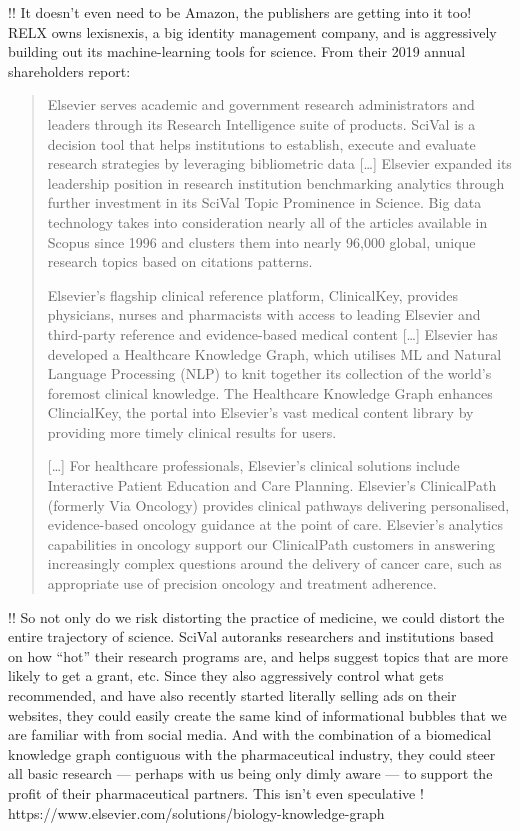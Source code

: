 \documentclass[10pt]{article}
\begin{document}
\begin{multicols}{2}
!! It doesn't even need to be Amazon, the publishers are getting into it
too! RELX owns lexisnexis, a big identity management company, and is
aggressively building out its machine-learning tools for science. From
their 2019 annual shareholders report:

\begin{quote}
Elsevier serves academic and government research administrators and
leaders through its Research Intelligence suite of products. SciVal is a
decision tool that helps institutions to establish, execute and evaluate
research strategies by leveraging bibliometric data {[}\ldots{]}
Elsevier expanded its leadership position in research institution
benchmarking analytics through further investment in its SciVal Topic
Prominence in Science. Big data technology takes into consideration
nearly all of the articles available in Scopus since 1996 and clusters
them into nearly 96,000 global, unique research topics based on
citations patterns.

Elsevier's flagship clinical reference platform, ClinicalKey, provides
physicians, nurses and pharmacists with access to leading Elsevier and
third-party reference and evidence-based medical content {[}\ldots{]}
Elsevier has developed a Healthcare Knowledge Graph, which utilises ML
and Natural Language Processing (NLP) to knit together its collection of
the world's foremost clinical knowledge. The Healthcare Knowledge Graph
enhances ClincialKey, the portal into Elsevier's vast medical content
library by providing more timely clinical results for users.

{[}\ldots{]} For healthcare professionals, Elsevier's clinical solutions
include Interactive Patient Education and Care Planning. Elsevier's
ClinicalPath (formerly Via Oncology) provides clinical pathways
delivering personalised, evidence-based oncology guidance at the point
of care. Elsevier's analytics capabilities in oncology support our
ClinicalPath customers in answering increasingly complex questions
around the delivery of cancer care, such as appropriate use of precision
oncology and treatment adherence.
\end{quote}

!! So not only do we risk distorting the practice of medicine, we could
distort the entire trajectory of science. SciVal autoranks researchers
and institutions based on how ``hot'' their research programs are, and
helps suggest topics that are more likely to get a grant, etc. Since
they also aggressively control what gets recommended, and have also
recently started literally selling ads on their websites, they could
easily create the same kind of informational bubbles that we are
familiar with from social media. And with the combination of a
biomedical knowledge graph contiguous with the pharmaceutical industry,
they could steer all basic research --- perhaps with us being only dimly
aware --- to support the profit of their pharmaceutical partners. This
isn't even speculative !
https://www.elsevier.com/solutions/biology-knowledge-graph


\end{multicols}
\end{document}
